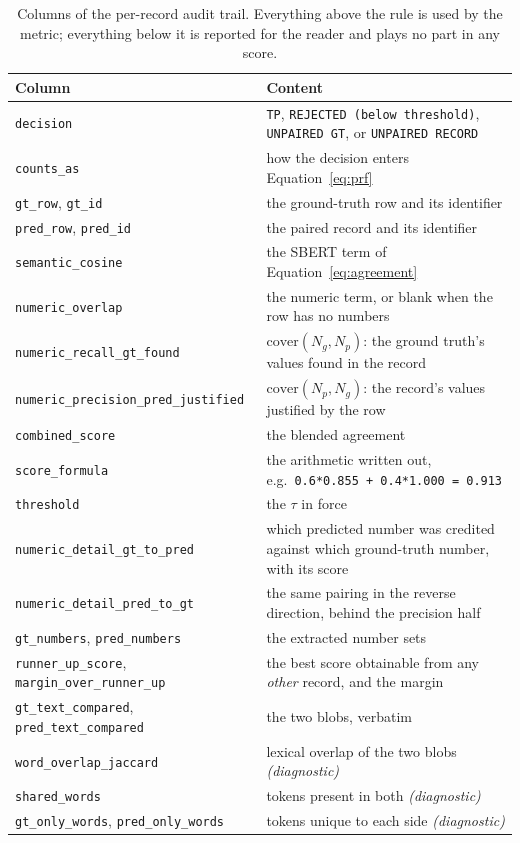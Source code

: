 \documentclass[11pt]{article}
\begin{document}
\begin{table}[H]
\centering
\caption{Columns of the per-record audit trail. Everything above the rule is used
by the metric; everything below it is reported for the reader and plays no part
in any score.}
\label{tab:audit_columns}
\small
\begin{tabular}{@{}lp{}@{}}
\toprule
\textbf{Column} & \textbf{Content} \\
\midrule
\texttt{decision} & \texttt{TP}, \texttt{REJECTED (below threshold)}, \texttt{UNPAIRED GT}, or \texttt{UNPAIRED RECORD} \\
\texttt{counts\_as} & how the decision enters Equation~\ref{eq:prf} \\
\texttt{gt\_row}, \texttt{gt\_id} & the ground-truth row and its identifier \\
\texttt{pred\_row}, \texttt{pred\_id} & the paired record and its identifier \\
\texttt{semantic\_cosine} & the SBERT term of Equation~\ref{eq:agreement} \\
\texttt{numeric\_overlap} & the numeric term, or blank when the row has no numbers \\
\texttt{numeric\_recall\_gt\_found} & $\mathrm{cover}(N_g,N_p)$: the ground truth's values found in the record \\
\texttt{numeric\_precision\_pred\_justified} & $\mathrm{cover}(N_p,N_g)$: the record's values justified by the row \\
\texttt{combined\_score} & the blended agreement \\
\texttt{score\_formula} & the arithmetic written out, e.g.\ \texttt{0.6*0.855 + 0.4*1.000 = 0.913} \\
\texttt{threshold} & the $\tau$ in force \\
\texttt{numeric\_detail\_gt\_to\_pred} & which predicted number was credited against which ground-truth number, with its score \\
\texttt{numeric\_detail\_pred\_to\_gt} & the same pairing in the reverse direction, behind the precision half \\
\texttt{gt\_numbers}, \texttt{pred\_numbers} & the extracted number sets \\
\texttt{runner\_up\_score}, \texttt{margin\_over\_runner\_up} & the best score obtainable from any \emph{other} record, and the margin \\
\texttt{gt\_text\_compared}, \texttt{pred\_text\_compared} & the two blobs, verbatim \\
\midrule
\texttt{word\_overlap\_jaccard} & lexical overlap of the two blobs \emph{(diagnostic)} \\
\texttt{shared\_words} & tokens present in both \emph{(diagnostic)} \\
\texttt{gt\_only\_words}, \texttt{pred\_only\_words} & tokens unique to each side \emph{(diagnostic)} \\
\bottomrule
\end{tabular}
\end{table}
\end{document}
